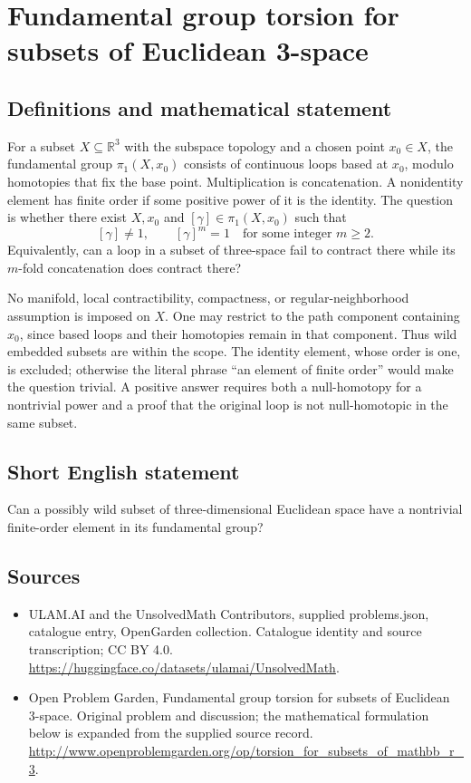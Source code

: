 \documentclass[11pt,a4paper]{article}
\begin{document}
\section*{Fundamental group torsion for subsets of Euclidean 3-space}\label{statement}

\subsection{Definitions and mathematical statement}
For a subset $X\subseteq\mathbb R^3$ with the subspace topology and
a chosen point $x_0\in X$, the fundamental group $\pi_1(X,x_0)$
consists of continuous loops based at $x_0$, modulo homotopies that
fix the base point. Multiplication is concatenation. A nonidentity
element has finite order if some positive power of it is the identity.
The question is whether there exist $X,x_0$ and $[\gamma]\in\pi_1(X,x_0)$
such that
\[
                     [\gamma]\ne1,\qquad [\gamma]^m=1
                        \quad\text{for some integer }m\ge2.
\]
Equivalently, can a loop in a subset of three-space fail to contract
there while its $m$-fold concatenation does contract there?

No manifold, local contractibility, compactness, or regular-neighborhood
assumption is imposed on $X$. One may restrict to the path component
containing $x_0$, since based loops and their homotopies remain in
that component. Thus wild embedded subsets are within the scope.
The identity element, whose order is one, is excluded; otherwise
the literal phrase ``an element of finite order'' would make the
question trivial. A positive answer requires both a null-homotopy
for a nontrivial power and a proof that the original loop is not
null-homotopic in the same subset.
\subsection{Short English statement}
Can a possibly wild subset of three-dimensional Euclidean space have a nontrivial finite-order element in its fundamental group?
\subsection{Sources}
\begin{itemize}
\item[S1] ULAM.AI and the UnsolvedMath Contributors, supplied problems.json, catalogue entry, OpenGarden collection. Catalogue identity and source transcription; CC BY 4.0.
\url{https://huggingface.co/datasets/ulamai/UnsolvedMath}.
\item[S2] Open Problem Garden, Fundamental group torsion for subsets of Euclidean 3-space. Original problem and discussion; the mathematical formulation below is expanded from the supplied source record.
\url{http://www.openproblemgarden.org/op/torsion_for_subsets_of_mathbb_r_3}.
\end{itemize}
\end{document}
